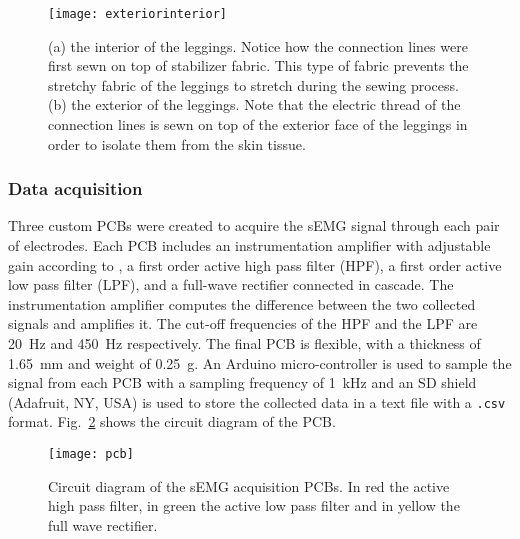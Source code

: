 \documentclass[letterpaper, 10 pt, conference]{ieeeconf}
\newcommand{\fref}[1]{Fig.~\ref{#1}}       \newcommand{\sref}[1]{\S\ref{#1}}          \newcommand{\tref}[1]{\tablename~\ref{#1}} \newcommand{\eref}[1]{(\ref{#1})}
\begin{document}
\begin{figure}[t!]
    \centering
    \texttt{[image: exteriorinterior]} \label{fig:interior} 
	\caption{(a) the interior of the leggings. Notice how the connection lines were first sewn on top of stabilizer fabric. This type of fabric prevents the stretchy fabric of the leggings to stretch during the sewing process. (b) the exterior of the leggings. Note that the electric thread of the connection lines is sewn on top of the exterior face of the leggings in order to isolate them from the skin tissue.}\label{f:leggings}
\end{figure}

\subsubsection{Data acquisition}
Three custom PCBs were created to acquire the sEMG signal through each pair of
electrodes. Each PCB includes an instrumentation amplifier with adjustable gain
according to , a first order active high pass filter
(HPF), a first order active low pass filter (LPF), and a full-wave rectifier
connected in cascade. The instrumentation amplifier computes the difference
between the two collected signals and amplifies it. The cut-off frequencies of
the HPF and the LPF are \SI{20}{\hertz} and \SI{450}{\hertz} respectively. The
final PCB is flexible, with a thickness of \SI{1.65}{\milli\meter} and weight
of \SI{0.25}{\gram}. An Arduino micro-controller is used to sample the signal
from each PCB with a sampling frequency of \SI{1}{\kilo\hertz} and an SD shield
(Adafruit, NY, USA) is used to store the collected data in a text file with a
\texttt{.csv} format. \fref{f:schematics} shows the circuit diagram of the PCB.

\begin{figure}[h!]
    \centering
    \texttt{[image: pcb]}
    \caption{Circuit diagram of the sEMG acquisition PCBs. In red the active high pass filter, in green the active low pass filter and in yellow the full wave rectifier.}
    \label{f:schematics}
\end{figure}
\end{document}
